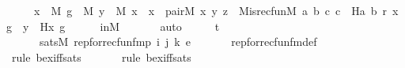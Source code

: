 \begin{isabellebody}
\ \ \ \ {\isachardoublequoteopen}{\isachardot}{\kern0pt}{\isachardot}{\kern0pt}{\isachardot}{\kern0pt}\ {\isasymlongleftrightarrow}{\isacharparenleft}{\kern0pt}{\isasymexists}x{\isacharprime}{\kern0pt}\ {\isasymin}\ M{\isachardot}{\kern0pt}\ {\isasymexists}g\ {\isasymin}\ M{\isachardot}{\kern0pt}\ {\isasymexists}y\ {\isasymin}\ M{\isachardot}{\kern0pt}\ x\ {\isacharequal}{\kern0pt}\ x{\isacharprime}{\kern0pt}\ {\isasymand}\ pair{\isacharparenleft}{\kern0pt}{\isacharhash}{\kern0pt}{\isacharhash}{\kern0pt}M{\isacharcomma}{\kern0pt}\ x{\isacharcomma}{\kern0pt}\ y{\isacharcomma}{\kern0pt}\ z{\isacharparenright}{\kern0pt}\ {\isasymand}\ M{\isacharunderscore}{\kern0pt}is{\isacharunderscore}{\kern0pt}recfun{\isacharparenleft}{\kern0pt}{\isacharhash}{\kern0pt}{\isacharhash}{\kern0pt}M{\isacharcomma}{\kern0pt}\ {\isasymlambda}a\ b\ c{\isachardot}{\kern0pt}\ c\ {\isacharequal}{\kern0pt}\ H{\isacharparenleft}{\kern0pt}a{\isacharcomma}{\kern0pt}\ b{\isacharparenright}{\kern0pt}{\isacharcomma}{\kern0pt}\ r{\isacharcomma}{\kern0pt}\ x{\isacharcomma}{\kern0pt}\ g{\isacharparenright}{\kern0pt}\ {\isasymand}\ y\ {\isacharequal}{\kern0pt}\ H{\isacharparenleft}{\kern0pt}x{\isacharcomma}{\kern0pt}\ g{\isacharparenright}{\kern0pt}{\isacharparenright}{\kern0pt}{\isachardoublequoteclose}\isanewline
\ \ \ \ \isamarkupfalse%
\ inM\ \isanewline
\ \ \ \ \isamarkupfalse%
\ auto\isanewline
\ \ \isamarkupfalse%
\ \isamarkupfalse%
\ t{}{\isacharcolon}{\kern0pt}\ \isanewline
\ \ \ \ {\isachardoublequoteopen}{\isachardot}{\kern0pt}{\isachardot}{\kern0pt}{\isachardot}{\kern0pt}\ {\isasymlongleftrightarrow}\ sats{\isacharparenleft}{\kern0pt}M{\isacharcomma}{\kern0pt}\ rep{\isacharunderscore}{\kern0pt}for{\isacharunderscore}{\kern0pt}recfun{\isacharunderscore}{\kern0pt}fm{\isacharparenleft}{\kern0pt}p{\isacharcomma}{\kern0pt}\ i{\isacharcomma}{\kern0pt}\ j{\isacharcomma}{\kern0pt}\ k{\isacharparenright}{\kern0pt}{\isacharcomma}{\kern0pt}\ e{\isacharparenright}{\kern0pt}{\isachardoublequoteclose}\ \isanewline
\ \ \ \ \isamarkupfalse%
\ rep{\isacharunderscore}{\kern0pt}for{\isacharunderscore}{\kern0pt}recfun{\isacharunderscore}{\kern0pt}fm{\isacharunderscore}{\kern0pt}def\ \isanewline
\ \ \ \ \isamarkupfalse%
\ {\isacharparenleft}{\kern0pt}rule\ bex{\isacharunderscore}{\kern0pt}iff{\isacharunderscore}{\kern0pt}sats{\isacharparenright}{\kern0pt}\isanewline
\ \ \ \ \ \isamarkupfalse%
\ {\isacharparenleft}{\kern0pt}rule\ bex{\isacharunderscore}{\kern0pt}iff{\isacharunderscore}{\kern0pt}sats{\isacharparenright}{\kern0pt}\isanewline

\end{isabellebody}
